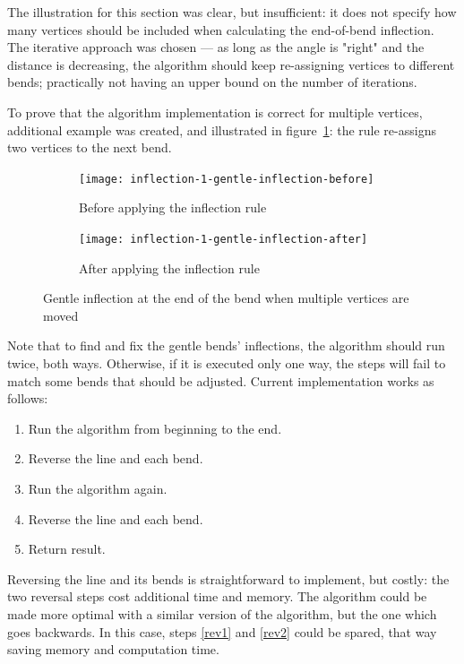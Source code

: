 \documentclass[a4paper]{article}
\begin{document}
The illustration for this section was clear, but insufficient: it does not
specify how many vertices should be included when calculating the end-of-bend
inflection. The iterative approach was chosen --- as long as the angle is "right"
and the distance is decreasing, the algorithm should keep re-assigning vertices
to different bends; practically not having an upper bound on the number of
iterations.

To prove that the algorithm implementation is correct for multiple vertices,
additional example was created, and illustrated in
figure~\ref{fig:inflection-1-gentle-inflection}: the rule re-assigns two
vertices to the next bend.

\begin{figure}[h]
    \centering
    \begin{subfigure}[b]{.49\textwidth}
        \texttt{[image: inflection-1-gentle-inflection-before]}
        \caption{Before applying the inflection rule}
    \end{subfigure}
    \hfill
    \begin{subfigure}[b]{.49\textwidth}
        \texttt{[image: inflection-1-gentle-inflection-after]}
        \caption{After applying the inflection rule}
    \end{subfigure}
    \caption{Gentle inflection at the end of the bend when multiple vertices
    are moved}
    \label{fig:inflection-1-gentle-inflection}
\end{figure}

Note that to find and fix the gentle bends' inflections, the algorithm should
run twice, both ways. Otherwise, if it is executed only one way, the steps will
fail to match some bends that should be adjusted. Current implementation works
as follows:

\begin{enumerate}
    \item Run the algorithm from beginning to the end.
    \item \label{rev1} Reverse the line and each bend.
    \item Run the algorithm again.
    \item \label{rev2} Reverse the line and each bend.
    \item Return result.
\end{enumerate}

Reversing the line and its bends is straightforward to implement, but costly:
the two reversal steps cost additional time and memory. The algorithm could be
made more optimal with a similar version of the algorithm, but the one which
goes backwards. In this case, steps \ref{rev1} and \ref{rev2} could be spared,
that way saving memory and computation time.
\end{document}
